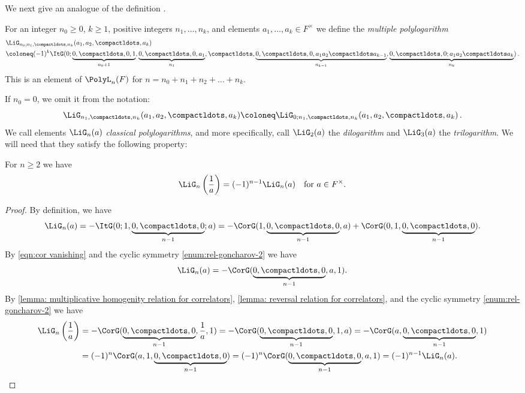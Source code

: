 \documentclass[a4paper]{amsart}
\begin{document}
\medskip

We next give an analogue of the definition \cite[(23)]{CMRR24}.

\begin{definition}For an integer $n_0\geq 0$, $k\ge1$, positive integers $n_1,\dots,n_k$, and elements $a_1,\dots,a_k\in F^\times$ we define the \emph{multiple polylogarithm}
\begin{align*}
&\LiG_{n_0; n_1,\compactldots,n_k}(a_1,a_2,\compactldots,a_k)\\
& \coloneq (-1)^{k}\ItG(0;\underbrace{0,\compactldots,0,1}_{n_0+1},\underbrace{0,\compactldots,0,a_1}_{n_1},\compactldots,\underbrace{0,\compactldots,0,a_1a_2\compactldots a_{k-1}}_{n_{k-1}},\underbrace{0,\compactldots,0;a_1a_2\compactldots a_{k}}_{n_k})\,.
\end{align*}
This is an element of $\PolyL_n(F)$ for $n=n_0+n_1+n_2+\dots+n_k$.\end{definition}

If $n_0=0$, we omit it from the notation:
\[
\LiG_{n_1,\compactldots,n_k}(a_1,a_2,\compactldots,a_k) \coloneq \LiG_{0;n_1,\compactldots,n_k}(a_1,a_2,\compactldots,a_k)\,.
\]
We call elements $\LiG_{n}(a)$ \emph{classical polylogarithms}, and more specifically, call $\LiG_2(a)$ the \emph{dilogarithm} and $\LiG_3(a)$ the \emph{trilogarithm}. We will need that they satisfy the following property:

\begin{lemma} \label{lemma: inversion for classical polylogs} For $n\geq 2$ we have
\[
\LiG_n\left(\frac{1}{a}\right)=(-1)^{n-1}\LiG_n(a) \quad \text{for $a\in F^{\times}$.}
\]
\end{lemma}

\begin{proof}
By definition, we have
\[
\LiG_n(a)=-\ItG(0;1,\underbrace{0,\compactldots,0}_{n-1};a)=-\CorG(1,\underbrace{0,\compactldots,0}_{n-1},a)+\CorG(0,1,\underbrace{0,\compactldots,0}_{n-1}).
\]
By \eqref{eqn:cor vanishing} and the cyclic symmetry \eqref{enum:rel-goncharov-2} we have 
\[
\LiG_n(a)=-\CorG(\underbrace{0,\compactldots,0}_{n-1},a,1).
\]
By \cref{lemma: multiplicative homogenity relation for correlators}, \cref{lemma: reversal relation for correlators}, and the cyclic symmetry \eqref{enum:rel-goncharov-2} we have 
\begin{align*}
\LiG_n\left(\frac{1}{a}\right)&=-\CorG(\underbrace{0,\compactldots,0}_{n-1},\frac{1}{a},1)=-\CorG(\underbrace{0,\compactldots,0}_{n-1},1,a)=-\CorG(a,\underbrace{0,\compactldots,0}_{n-1},1)\\
&=(-1)^{n}\CorG(a,1,\underbrace{0,\compactldots,0}_{n-1})=(-1)^{n}\CorG(\underbrace{0,\compactldots,0}_{n-1},a,1)=(-1)^{n-1}\LiG_n(a).
\end{align*}
\end{proof}
\end{document}
